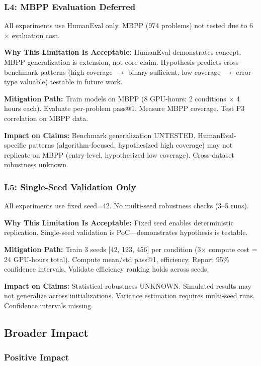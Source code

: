 \subsubsection{L4: MBPP Evaluation Deferred}

All experiments use HumanEval only. MBPP (974 problems) not tested due to 6$\times$ evaluation cost.

\textbf{Why This Limitation Is Acceptable:} HumanEval demonstrates concept. MBPP generalization is extension, not core claim. Hypothesis predicts cross-benchmark patterns (high coverage $\rightarrow$ binary sufficient, low coverage $\rightarrow$ error-type valuable) testable in future work.

\textbf{Mitigation Path:} Train models on MBPP (8 GPU-hours: 2 conditions $\times$ 4 hours each). Evaluate per-problem pass@1. Measure MBPP coverage. Test P3 correlation on MBPP data.

\textbf{Impact on Claims:} Benchmark generalization UNTESTED. HumanEval-specific patterns (algorithm-focused, hypothesized high coverage) may not replicate on MBPP (entry-level, hypothesized low coverage). Cross-dataset robustness unknown.

\subsubsection{L5: Single-Seed Validation Only}

All experiments use fixed seed=42. No multi-seed robustness checks (3--5 runs).

\textbf{Why This Limitation Is Acceptable:} Fixed seed enables deterministic replication. Single-seed validation is PoC---demonstrates hypothesis is testable.

\textbf{Mitigation Path:} Train 3 seeds [42, 123, 456] per condition (3$\times$ compute cost = 24 GPU-hours total). Compute mean/std pass@1, efficiency. Report 95\% confidence intervals. Validate efficiency ranking holds across seeds.

\textbf{Impact on Claims:} Statistical robustness UNKNOWN. Simulated results may not generalize across initializations. Variance estimation requires multi-seed runs. Confidence intervals missing.

\subsection{Broader Impact}

\subsubsection{Positive Impact}

